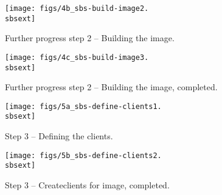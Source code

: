 \begin{figure}[htbp]
  \begin{center}
    \texttt{[image: figs/4b\_sbs-build-image2.\\sbsext]}
    \caption{Further progress step 2 -- Building the image.}
    \label{fig:sbs-build-image-progress}
  \end{center}
\end{figure}

\begin{figure}[htbp]
  \begin{center}
    \texttt{[image: figs/4c\_sbs-build-image3.\\sbsext]}
    \caption{Further progress step 2 -- Building the image, completed.}
    \label{fig:sbs-build-image2}
  \end{center}
\end{figure}


\begin{figure}[htbp]
  \begin{center}
    \texttt{[image: figs/5a\_sbs-define-clients1.\\sbsext]}
    \caption{Step 3 -- Defining the clients.}
    \label{fig:sbs-define-clients}
  \end{center}
\end{figure}

\begin{figure}[htbp]
  \begin{center}
    \texttt{[image: figs/5b\_sbs-define-clients2.\\sbsext]}
    \caption{Step 3 -- Createclients for image, completed.}
    \label{fig:sbs-define-clients2}
  \end{center}
\end{figure}


